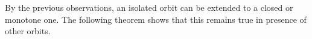 \documentclass[oneside,notitlepage,12pt]{article}
\theoremstyle{definition}
\theoremstyle{remark}
\newtheorem{observation}[tw]{Observation}
\newcommand \Z {\mathbb{Z}}
\begin{document}

\medskip
By the previous observations,  an isolated orbit can be extended to a closed or monotone one.
The following theorem shows that this remains true in presence of other orbits.
\end{document}
